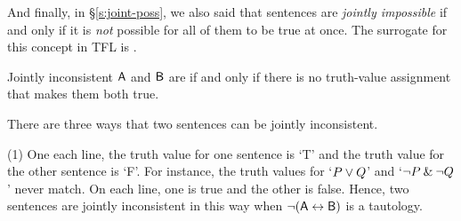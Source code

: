 And finally, in \S\ref{s:joint-poss}, we also said that sentences are \textit{jointly impossible} if and only if it is \textit{not} possible for all of them to be true at once. The surrogate for this concept in TFL is . 

\begin{factboxy}{Jointly inconsistent}
$\mathsf{A}$ and $\mathsf{B}$ are  if and only if there is no truth-value assignment that makes them both true. 
\end{factboxy}

\noindent There are three ways that two sentences can be jointly inconsistent.

\begin{ebullet}	
\item[(1)] One each line, the truth value for one sentence is `T' and the truth value for the other sentence is `F'. For instance, the truth values for `$P \vee Q$' and `${\neg} P \mathbin{\&} {\neg} Q$' never match. On each line, one is true and the other is false. Hence, two sentences are jointly inconsistent in this way when ${\neg}(\mathsf{A} \leftrightarrow \mathsf{B})$ is a tautology.


\end{ebullet}
